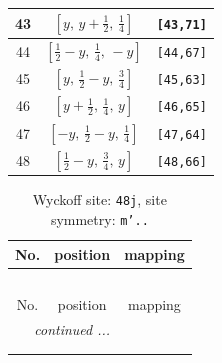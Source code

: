 \documentclass[fleqn,8pt]{jsarticle}
\begin{document}
\begin{longtable}{ccc}
43 & $\left[ y,\, y + \frac{1}{2},\, \frac{1}{4} \right]$ & {\tt [43,71]} \\ \hline
44 & $\left[ \frac{1}{2} - y,\, \frac{1}{4},\, - y \right]$ & {\tt [44,67]} \\ \hline
45 & $\left[ y,\, \frac{1}{2} - y,\, \frac{3}{4} \right]$ & {\tt [45,63]} \\ \hline
46 & $\left[ y + \frac{1}{2},\, \frac{1}{4},\, y \right]$ & {\tt [46,65]} \\ \hline
47 & $\left[ - y,\, \frac{1}{2} - y,\, \frac{1}{4} \right]$ & {\tt [47,64]} \\ \hline
48 & $\left[ \frac{1}{2} - y,\, \frac{3}{4},\, y \right]$ & {\tt [48,66]} \\
\end{longtable}
\renewcommand{\arraystretch}{1.2}
\begin{longtable}{ccc}
\caption{Wyckoff site: {\tt 48j}, site symmetry: {\tt m'..}}
 \\
 \hline \hline
No. & position & mapping \\ \hline \endfirsthead

\multicolumn{2}{l}{\tablename\ \thetable{}} \\
 \hline \hline
No. & position & mapping \\ \hline \endhead

 \hline \hline
\multicolumn{2}{r}{\footnotesize\it continued ...} \\ \endfoot

 \hline \hline
\multicolumn{2}{r}{} \\ \endlastfoot


\end{longtable}
\end{document}
